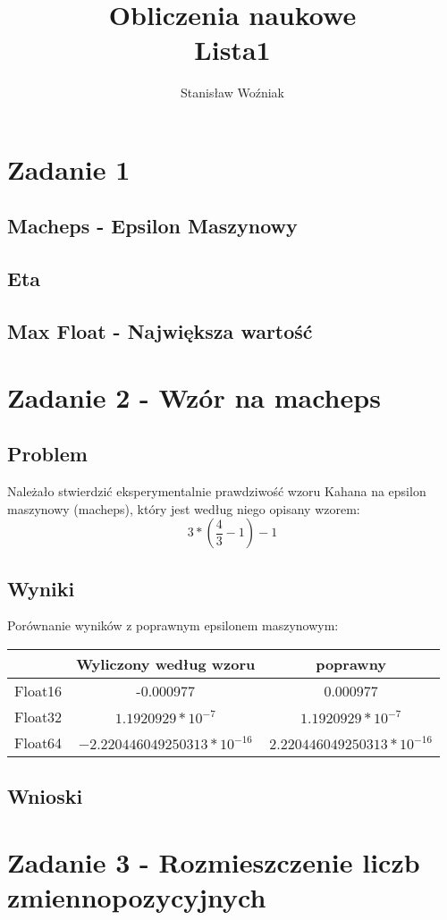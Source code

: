 \documentclass[12pt, a4paper]{article}
\title{Obliczenia naukowe\\Lista1}
\author{Stanisław Woźniak}
\date{}
\begin{document}
\maketitle


\section{Zadanie 1}
\subsection{Macheps - Epsilon Maszynowy}
\subsection{Eta}
\subsection{Max Float - Największa wartość}

\section{Zadanie 2 - Wzór na macheps}
\subsection{Problem}
Należało stwierdzić eksperymentalnie prawdziwość wzoru Kahana na epsilon maszynowy (macheps), który jest według niego opisany wzorem:
\[3*(\frac{4}{3} - 1) - 1\]
\subsection{Wyniki}
Porównanie wyników z poprawnym epsilonem maszynowym:
\begin{center}
\begin{tabular}{ c|c|c}
  & Wyliczony według wzoru & poprawny\\
  \hline
 Float16 & -0.000977 & 0.000977\\
 Float32 & $1.1920929 * 10^{-7}$ & $1.1920929 * 10^{-7}$\\
 Float64 & $-2.220446049250313 * 10^{-16}$ & $2.220446049250313 * 10^{-16}$
\end{tabular}
\end{center}
\subsection{Wnioski}


\section{Zadanie 3 - Rozmieszczenie liczb zmiennopozycyjnych}
\end{document}
